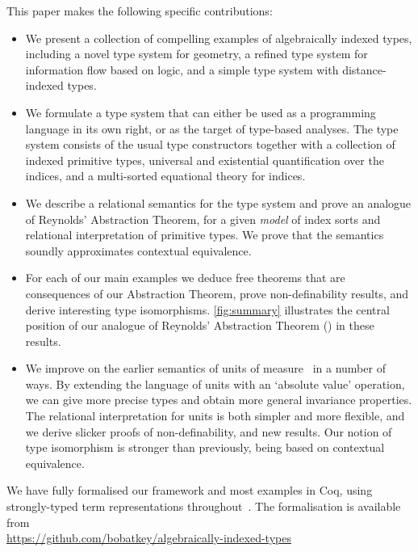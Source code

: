This paper makes the following specific contributions:
\begin{itemize}
\item 
We present a collection of compelling examples of algebraically
indexed types, including a novel type system for geometry, a
refined type system for information flow based on logic, and a simple
type system with distance-indexed types.
\item 
We formulate a type system that can either be used as a programming
language in its own right, or as the target of type-based
analyses. The type system consists of the usual type constructors
together with a collection of indexed primitive types, universal and
existential quantification over the indices, and a multi-sorted
equational theory for indices.
\item
We describe a relational semantics for the type system and prove an
analogue of Reynolds' Abstraction Theorem, for a given \emph{model}
of index sorts and relational interpretation of primitive types.
We prove that the semantics soundly approximates contextual equivalence.
\item
For each of our main examples we deduce free theorems that are
consequences of our Abstraction Theorem, prove non-definability
results, and derive interesting type isomorphisms. \autoref{fig:summary}
illustrates the central position of our analogue of Reynolds' Abstraction
Theorem () in these results.
\item
We improve on the earlier semantics of
units of measure~\cite{kennedy97relational} in a number of ways.  By
extending the language of units with an `absolute value' operation, we
can give more precise types and obtain more general invariance
properties.  The relational interpretation for units is both simpler
and more flexible, and we derive slicker proofs of non-definability,
and new results.  Our notion of type isomorphism is stronger than
previously, being based on contextual equivalence.
\end{itemize}
We have fully formalised our framework and most examples in Coq,
using strongly-typed term representations
throughout~\cite{TypedSyntax}. The formalisation is available from
\\{\small \url{https://github.com/bobatkey/algebraically-indexed-types}}



